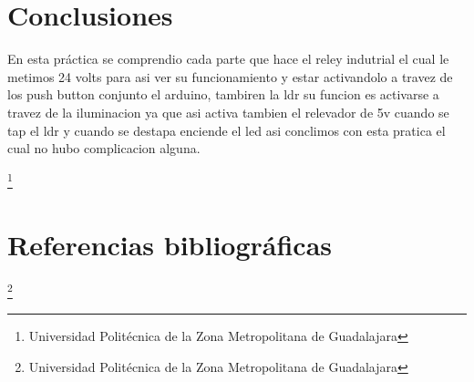 \documentclass[10pt,a4paper]{article}
\begin{document}
 
\section{Conclusiones}
En esta práctica se comprendio cada parte que hace el reley indutrial el cual le metimos 24 volts para asi ver su funcionamiento y estar activandolo a travez de los push button conjunto el arduino, tambiren la ldr su funcion es activarse a travez de la iluminacion ya que asi activa tambien el relevador de 5v cuando se tap el ldr y cuando se destapa enciende el led asi conclimos con esta pratica el cual no hubo complicacion alguna.


\footnote{Universidad Politécnica de la Zona Metropolitana de Guadalajara}

\newpage
\section{Referencias bibliográficas}
\footnote{Universidad Politécnica de la Zona Metropolitana de Guadalajara}
\end{document}
